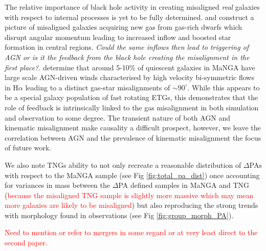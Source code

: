 \documentclass[fleqn,usenatbib]{mnras}
\newcommand{\red}[1]{{\textcolor{red}{#1}}}
\begin{document}
The relative importance of black hole activity in creating misaligned \textit{real} galaxies with respect to internal processes is yet to be fully determined. \citet{chen2016} and \citet{jin2016} construct a picture of misaligned galaxies acquiring new gas from gas-rich dwarfs which disrupt angular momentum leading to increased inflow and boosted star formation in central regions. \textit{Could the same inflows then lead to triggering of AGN or is it the feedback from the black hole creating the misalignment in the first place?}. \citet{roy2018} determine that around 5-10\% of quiescent galaxies in MaNGA have large scale AGN-driven winds characterised by high velocity bi-symmetric flows in H$\alpha$ leading to a distinct gas-star misalignments of $\sim 90^{\circ}$. While this appears to be a special galaxy population of fast rotating ETGs, this demonstrates that the role of feedback is intrinsically linked to the gas misalignment in both simulation and observation to some degree. The transient nature of both AGN and kinematic misalignment make causality a difficult prospect, however, we leave the correlation between AGN and the prevalence of kinematic misalignment the focus of future work. 

We also note TNGs ability to not only recreate a reasonable distribution of $\Delta$PAs with respect to the MaNGA sample (see Fig \ref{fig:total_pa_dist}) once accounting for variances in mass between the $\Delta$PA defined samples in MaNGA and TNG (\red{because the misaligned TNG sample is slightly more massive which may mean more galaxies are likely to be misaligned}) but also reproducing the strong trends with morphology found in observations (see Fig \ref{fig:group_morph_PA}). 

\red{Need to mention or refer to mergers in some regard or at very least direct to the second paper.}
 
\end{document}
